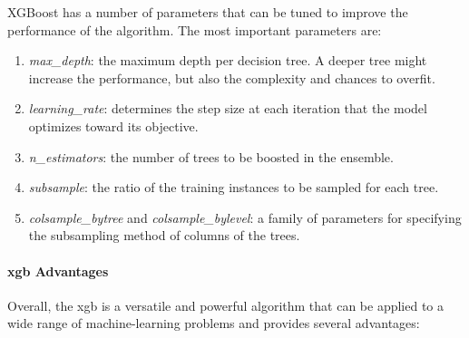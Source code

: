 XGBoost has a number of parameters that can be tuned to improve the performance of the algorithm. The most important parameters are:

\begin{enumerate}
	\item \textit{max\_depth}: the maximum depth per decision tree. A deeper tree might increase the performance, but also the complexity and chances to overfit.
	
	\item \textit{learning\_rate}: determines the step size at each iteration that the model optimizes toward its objective.
	
	\item \textit{n\_estimators}: the number of trees to be boosted in the ensemble.
	
	\item \textit{subsample}: the ratio of the training instances to be sampled for each tree.
	
	\item \textit{colsample\_bytree} and \textit{colsample\_bylevel}: a family of parameters for specifying the subsampling method of columns of the trees.
\end{enumerate}


\paragraph{\acl{xgb} Advantages}

Overall, the \ac{xgb} is a versatile and powerful algorithm that can be applied to a wide range of machine-learning problems and provides several advantages:

